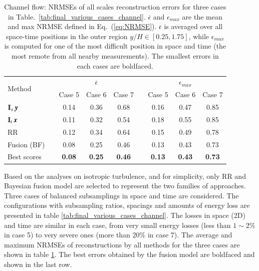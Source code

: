 \begin{table}
\caption{\label{tab:final_results_channel}
Channel flow: NRMSEs of all scales reconstruction errors for three cases in Table.~\ref{tab:final_various_cases_channel}. $\overline{\epsilon}$ and $\epsilon_{max}$ are the mean and max NRMSE defined in Eq.~(\ref{eq:NRMSE}). $\overline{\epsilon}$ is averaged over all space-time positions in the outer region $ y/H \in [0.25,1.75] $, while $\epsilon_{max}$ is computed for one of the most difficult position in space and time (the most remote from all nearby measurements). The smallest errors in each cases are boldfaced.}
\vspace{.5cm}
\centering
	\begin{tabular}{lcccccccc} 
		\toprule \multirow{2}{*}{Method}&\multicolumn{1}{c}{}&\multicolumn{3}{c}{$\overline{\epsilon}$}&\multicolumn{1}{c}{}&\multicolumn{3}{c}{$\epsilon_{max}$}\\
		\cmidrule{3-5} \cmidrule{7-9}
		 & & {Case 5} & {Case 6} & {Case 7} & & {Case 5} & {Case 6} & {Case 7}\\
		\midrule 
		$ \Interp_s \y $ & & 0.14 & 0.36 & 0.68 & & 0.16 & 0.47 &  0.85 \\ 
		$ \Interp_t \x $ & & 0.11 & 0.32 & 0.54 & & 0.18 & 0.55 &  0.85 \\
		RR & & 0.12 & 0.34 & 0.64 & & 0.15 & 0.49 &  0.78 \\
    	Fusion (BF)  & & 0.08 & 0.25 & 0.46 & & 0.13 &  0.43 &  0.73 \\ 
    	\midrule
    	\myrowcolour
    	Best scores  & & \textbf{0.08} & \textbf{0.25} & \textbf{0.46} & & \textbf{0.13} &  \textbf{0.43} &  \textbf{0.73} \\ \bottomrule
	\end{tabular}
\end{table}

Based on the analyses on isotropic turbulence, and for simplicity, only RR and Bayesian fusion model are selected to represent the two families of approaches. Three cases of balanced subsamplings in space and time are considered. The configurations with subsampling ratios, spacings and amounts of energy loss are presented in table \ref{tab:final_various_cases_channel}. The losses in space (2D) and time are similar in each case, from very small energy losses (less than $ 1 \sim 2 \% $ in case 5) to very severe ones (more than $ 20 \% $ in case 7). The average and maximum NRMSEs of reconstructions by all methods for the three cases are shown in table \ref{tab:final_results_channel}. The best errors obtained by the fusion model are boldfaced and shown in the last row. 


